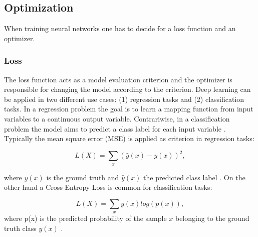 \subsection{Optimization}
When training neural networks one has to decide for a loss function and an optimizer. 

\subsubsection{Loss}
The loss function acts as a model evaluation criterion and the optimizer is responsible for changing the model according to the criterion. Deep learning can be applied in two different use cases: (1) regression tasks and (2) classification tasks. In a regression problem the goal is to learn a mapping function from input variables to a continuous output variable. Contrariwise, in a classification problem the model aims to predict a class label for each input variable \cite{ShilohPerl2020}. Typically the mean square error (MSE) is applied as criterion in regression tasks:

\begin{equation}
L(X) =  \sum_{x}(\hat{y}(x)-y(x))^2,
\end{equation}

where $y(x)$ is the ground truth and $\hat{y}(x)$ the predicted class label \cite{ShilohPerl2020}. On the other hand a Cross Entropy Loss is common for classification tasks: 

\begin{equation}
L(X) = \sum_{x} y(x) log(p(x)),
\end{equation}
where p(x) is the predicted probability of the sample $x$ belonging to the ground truth class $y(x)$ \cite{ShilohPerl2020}.

